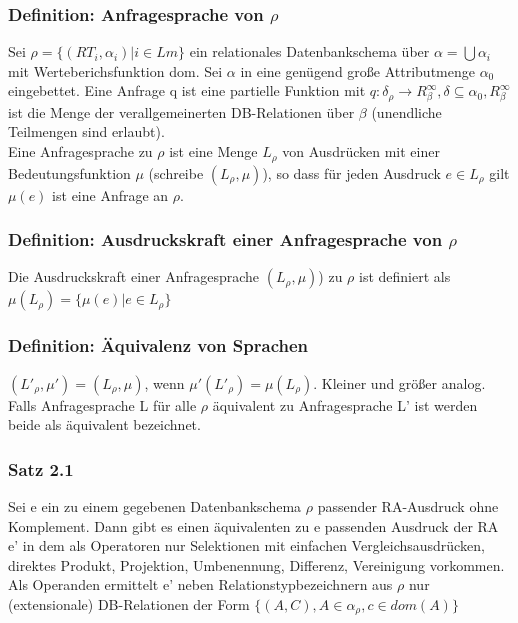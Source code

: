 \documentclass[12pt, a4paper]{article}
\begin{document}
\subsubsection*{Definition: Anfragesprache von $\rho$}
Sei $\rho = \{ (RT_i, \alpha_i) | i \in Lm \}$ ein relationales Datenbankschema über $\alpha = \bigcup \alpha_i$ mit Werteberichsfunktion dom. Sei $\alpha$ in eine genügend große Attributmenge $\alpha_0$ eingebettet. Eine Anfrage q ist eine partielle Funktion mit $q: \delta_\rho \rightarrow R^{\infty}_\beta,  \delta \subseteq \alpha_0, R^{\infty}_\beta$ ist die Menge der verallgemeinerten DB-Relationen über $\beta$ (unendliche Teilmengen sind erlaubt). \\
Eine Anfragesprache zu $\rho$ ist eine Menge $L_\rho$ von Ausdrücken mit einer Bedeutungsfunktion $\mu$ (schreibe $(L_\rho, \mu)$), so dass für jeden Ausdruck $e \in L_\rho$ gilt $\mu(e)$ ist eine Anfrage an $\rho$.

\subsubsection*{Definition: Ausdruckskraft einer Anfragesprache von $\rho$}
Die Ausdruckskraft einer Anfragesprache $(L_\rho, \mu)$) zu $\rho$ ist definiert als $\mu(L_\rho) = \{ \mu(e) | e \in L_\rho \}$

\subsubsection*{Definition: Äquivalenz von Sprachen}
$(L'_\rho, \mu') = (L_\rho, \mu)$, wenn $\mu'(L'_\rho) = \mu(L_\rho)$. Kleiner und größer analog.
Falls Anfragesprache L für alle $\rho$ äquivalent zu Anfragesprache L' ist werden beide als äquivalent bezeichnet.

\subsubsection*{Satz 2.1}
Sei e ein zu einem gegebenen Datenbankschema $\rho$ passender RA-Ausdruck ohne Komplement. Dann gibt es einen äquivalenten zu e passenden Ausdruck der RA e' in dem als Operatoren nur Selektionen mit einfachen Vergleichsausdrücken, direktes Produkt, Projektion, Umbenennung, Differenz, Vereinigung vorkommen. Als Operanden ermittelt e' neben Relationstypbezeichnern aus $\rho$ nur (extensionale) DB-Relationen der Form $\{(A, C), A \in \alpha_\rho, c \in dom(A) \} $\\
\end{document}

